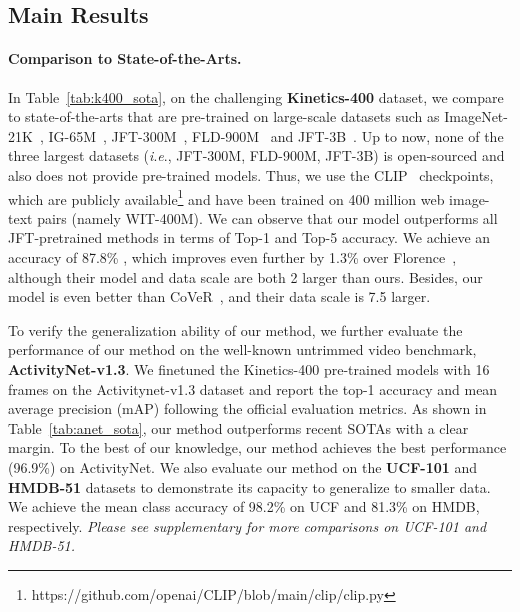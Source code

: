 \documentclass[letterpaper]{article} \usepackage{aaai23}  \usepackage{times}  \usepackage{helvet}  \usepackage{courier}  \usepackage[hyphens]{url}  \usepackage{graphicx} \urlstyle{rm} \def\UrlFont{\rm}  \usepackage{natbib}  \usepackage{caption} \frenchspacing  \setlength{\pdfpagewidth}{8.5in}  \setlength{\pdfpageheight}{11in}  \usepackage{algorithm}
\newcommand{\ie}{\textit{i}.\textit{e}.}
\begin{document}
\subsection{Main Results}

\paragraph{Comparison to State-of-the-Arts.} In Table~\ref{tab:k400_sota}, on the challenging \textbf{Kinetics-400} dataset, we compare to state-of-the-arts that are pre-trained on large-scale datasets such as ImageNet-21K~\cite{deng2009imagenet}, IG-65M~\cite{ig65m}, JFT-300M~\cite{JFT300M}, FLD-900M~\cite{yuan2021florence} and JFT-3B~\cite{JFT3B}. 
Up to now, none of the three largest datasets (\ie, JFT-300M, FLD-900M, JFT-3B) is open-sourced and also does not provide pre-trained models.
Thus, we use the CLIP~\cite{CLIP} checkpoints, which are publicly available\footnote{https://github.com/openai/CLIP/blob/main/clip/clip.py} and have been trained on 400 million web image-text pairs (namely WIT-400M).
We can observe that our model outperforms all JFT-pretrained methods in terms of Top-1 and Top-5 accuracy. 
We achieve an accuracy of 87.8\% , which improves even further by 1.3\% over Florence~\cite{yuan2021florence}, although their model and data scale are both 2 larger than ours.
Besides, our model is even better than CoVeR~\cite{cover}, and their data scale is 7.5 larger.

To verify the generalization ability of our method, we further evaluate the performance of our method on the well-known untrimmed video benchmark, \textbf{ActivityNet-v1.3}. We finetuned the Kinetics-400 pre-trained models with 16 frames on the Activitynet-v1.3 dataset and report the  top-1 accuracy and mean average precision (mAP) following the official evaluation metrics. As shown in Table~\ref{tab:anet_sota}, our method outperforms recent SOTAs with a clear margin. To the best of our knowledge, our method achieves the best performance (96.9\%) on ActivityNet.
We also evaluate our method on the \textbf{UCF-101} and \textbf{HMDB-51} datasets to demonstrate its capacity to generalize to smaller data. We achieve the mean class accuracy of 98.2\% on UCF and 81.3\% on HMDB, respectively. 
\emph{Please see supplementary for more comparisons on UCF-101 and HMDB-51.}
\end{document}
